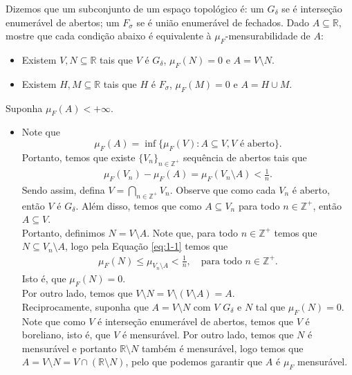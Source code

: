 \begin{homeworkProblem}[1]
  Dizemos que um subconjunto de um espaço topológico é: um $G_\delta$ se é interseção enumerável de abertos; um $F_\sigma$ se é união enumerável de fechados. Dado $A\subseteq \mathbb{R}$, mostre que cada condição abaixo é equivalente à $\mu_F$-mensurabilidade de $A$:
  \begin{itemize}
    \item Existem $V,N\subseteq \mathbb{R}$ tais que $V$ é $G_\delta$, $\mu_F(N)=0$ e $A=V\setminus N$.
      \item Existem $H,M\subseteq \mathbb{R}$ tais que $H$ é $F_\sigma$, $\mu_F(M)=0$ e $A=H\cup M$. 
  \end{itemize}
  \begin{solution}
    Suponha $\mu_F(A)<+\infty$.\\
  \begin{itemize}
  \item Note que
    \begin{equation}\label{eq:1-1}
      \mu_F(A)=\inf\{\mu_F(V):A\subseteq V, V\text{ é aberto}\}.
    \end{equation}
    Portanto, temos que existe $\{V_n\}_{n\in\mathbb{Z}^{+}}$ sequência de abertos tais que
    \begin{align*}
      \mu_F(V_n)-\mu_F(A)=\mu_F(V_n\setminus A)<\frac{1}{n}.
    \end{align*}
    Sendo assim, defina $V=\bigcap_{n\in\mathbb{Z}^{+}}V_n$. Observe que como cada $V_n$ é aberto, então $V$ é $G_\delta$. Além disso, temos que como $A\subseteq V_n$ para todo $n\in\mathbb{Z}^{+}$, então $A\subseteq V$.\\
    Portanto, definimos $N=V\setminus A$. Note que, para todo $n\in\mathbb{Z}^{+}$ temos que $N\subseteq V_n\setminus A$, logo pela Equação \eqref{eq:1-1} temos que
    \begin{align*}
      \mu_F(N)\leq \mu_{V_n\setminus A}<\frac{1}{n},\quad\text{para todo }n\in\mathbb{Z}^{+}.
    \end{align*}
    Isto é, que $\mu_F(N)=0$.\\
    Por outro lado, temos que $V\setminus N= V\setminus (V\setminus A)=A$.\\
    Reciprocamente, suponha que $A=V\setminus N$ com $V$ $G_\delta$ e $N$ tal que $\mu_F(N)=0$.\\
    Note que como $V$ é interseção enumerável de abertos, temos que $V$ é boreliano, isto é, que $V$ é mensurável. Por outro lado, temos que $N$ é mensurável e portanto $\mathbb{R}\setminus N$ também é mensurável, logo temos que $A=V\setminus N= V\cap(\mathbb{R}\setminus N)$, pelo que podemos garantir que $A$ é $\mu_F$ mensurável.\\

\end{itemize}
\end{solution}
\end{homeworkProblem}
